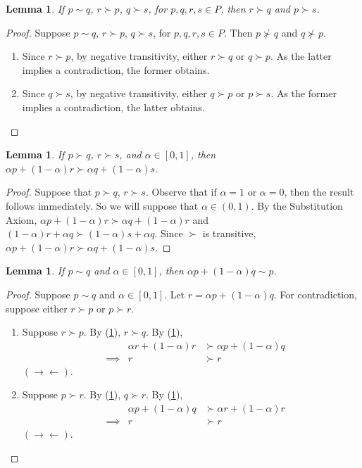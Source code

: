 \documentclass[12pt]{article}
\newtheorem{lem}[thm]{Lemma}
\theoremstyle{definition}
\theoremstyle{remark}
\def\contra{\rightarrow \leftarrow}
\begin{document}
\begin{lem} \label{lem1c.1}
  If $p \sim q$, $r \succ p$, $q \succ s$, for $p, q, r, s \in P$, then $r \succ q$ and $p \succ s$.
\end{lem}
\begin{proof}
  Suppose $p \sim q$, $r \succ p$, $q \succ s$, for $p, q, r, s \in P$. Then $p \not \succ q$ and $q \not \succ p$.
  \begin{enumerate}
    \item Since $r \succ p$, by negative transitivity, either $r \succ q$ or $q \succ p$. As the latter implies a contradiction, the former obtains.
    \item Since $q \succ s$, by negative transitivity, either $q \succ p$ or $p \succ s$. As the former implies a contradiction, the latter obtains.
  \end{enumerate}
\end{proof}
\begin{lem} \label{lem1c.2}
  If $p \succ q$, $r \succ s$, and $\alpha \in [0,1]$, then $\alpha p + (1 - \alpha)r \succ \alpha q + (1 - \alpha)s$.
\end{lem}
\begin{proof}
  Suppose that $p \succ q$, $r \succ s$. Observe that if $\alpha = 1$ or $\alpha = 0$, then the result follows immediately. So we will suppose that $\alpha \in (0,1)$. By the Substitution Axiom, $\alpha p + (1 - \alpha)r \succ \alpha q + (1 - \alpha)r$ and $(1 - \alpha)r + \alpha q \succ ( 1 - \alpha )s + \alpha q$.
  Since $\succ$ is transitive, $\alpha p + (1 - \alpha)r \succ \alpha q + (1 - \alpha)s$.
\end{proof}
\begin{lem} \label{lem1c.3}
  If $p \sim q$ and $\alpha \in [0,1]$, then $\alpha p + (1 - \alpha)q \sim p$.
\end{lem}
\begin{proof}
  Suppose $p \sim q$ and $\alpha \in [0,1]$. Let $r = \alpha p + (1 - \alpha)q$. For contradiction, suppose either $r \succ p$ or $p \succ r$.
  \begin{enumerate}
    \item Suppose $r \succ p$. By (\ref{lem1c.1}), $r \succ q$. By (\ref{lem1c.2}),
    \begin{align*}
      &           & \alpha r + (1 - \alpha)r &\succ \alpha p + (1 - \alpha)q \\
      & \implies   & r &\succ r
    \end{align*}
    $(\contra)$.
    \item Suppose $p \succ r$. By (\ref{lem1c.1}), $q \succ r$. By (\ref{lem1c.2}),
    \begin{align*}
      &           & \alpha p + (1 - \alpha)q  &\succ \alpha r + (1 - \alpha)r \\
      & \implies   & r &\succ r
    \end{align*}
    $(\contra)$.
  \end{enumerate}
\end{proof}
\end{document}
